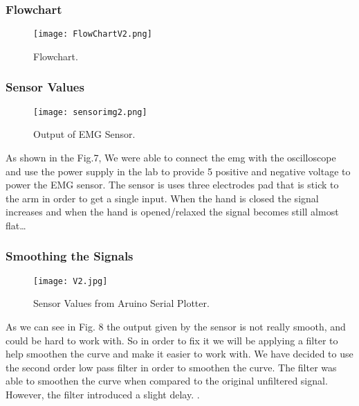 \documentclass[12pt]{article}
\begin{document}
    \subsubsection{Flowchart}
    \begin{figure}[!htbp]
        \centering
        \texttt{[image: FlowChartV2.png]}
        \caption{Flowchart.}
    \end{figure}
    \break
    \subsubsection{Sensor Values}
    \begin{flushleft}
        \begin{figure}[!htbp]
            \centering
            \texttt{[image: sensorimg2.png]}
            \caption{Output of EMG Sensor.}
        \end{figure}
        As shown in the Fig.7, We were able to connect the emg 
        with the oscilloscope and use the power supply in the lab to provide 5 positive and negative voltage to power the EMG sensor.
        The sensor is uses three electrodes pad that is stick to the arm in order to get a single input. When the hand is closed the 
        signal increases and when the hand is opened/relaxed the signal becomes still almost flat\dots
    \end{flushleft}
    \break
    \subsubsection{Smoothing the Signals}
    \begin{flushleft}
        \begin{figure}[!htbp]
            \centering
            \texttt{[image: V2.jpg]}
            \caption{Sensor Values from Aruino Serial Plotter.}
        \end{figure}
        As we can see in Fig. 8 the output given by the sensor is not really smooth, and could be hard to
        work with. So in order to fix it we will be applying a filter to help smoothen the curve and make it easier
        to work with. We have decided to use the second order low pass filter in order to smoothen the curve. The filter was 
        able to smoothen the curve when compared to the original unfiltered signal. However, the filter introduced a slight delay.
        \cite{lowppassfilter}
        \cite{filterEmg}.
    \end{flushleft}
\end{document}
